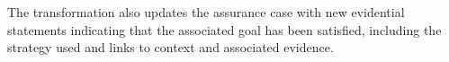 The transformation also updates the assurance case with new evidential statements indicating that the associated goal has been satisfied, including 
the strategy used and links to context and associated evidence.  

%
%

%
